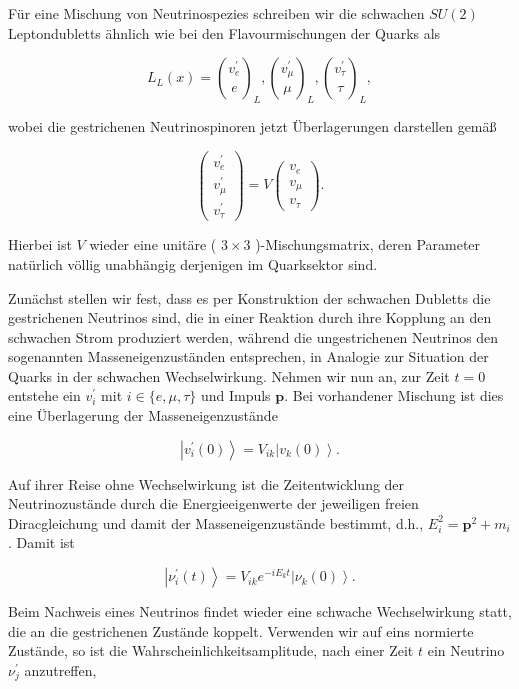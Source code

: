 \documentclass[10pt, letterpaper]{article}
\begin{document}
Für eine Mischung von Neutrinospezies schreiben wir die schwachen $S U(2)$ Leptondubletts ähnlich wie bei den Flavourmischungen der Quarks als

$$
L_{L}(x)=\binom{v_{e}^{\prime}}{e}_{L},\binom{v_{\mu}^{\prime}}{\mu}_{L},\binom{v_{\tau}^{\prime}}{\tau}_{L},
$$

wobei die gestrichenen Neutrinospinoren jetzt Überlagerungen darstellen gemäß

$$
\left(\begin{array}{l}
v_{e}^{\prime} \\
v_{\mu}^{\prime} \\
v_{\tau}^{\prime}
\end{array}\right)=V\left(\begin{array}{l}
v_{e} \\
v_{\mu} \\
v_{\tau}
\end{array}\right) .
$$

Hierbei ist $V$ wieder eine unitäre ( $3 \times 3$ )-Mischungsmatrix, deren Parameter natürlich völlig unabhängig derjenigen im Quarksektor sind.

Zunächst stellen wir fest, dass es per Konstruktion der schwachen Dubletts die gestrichenen Neutrinos sind, die in einer Reaktion durch ihre Kopplung an den schwachen Strom produziert werden, während die ungestrichenen Neutrinos den sogenannten Masseneigenzuständen entsprechen, in Analogie zur Situation der Quarks in der schwachen Wechselwirkung. Nehmen wir nun an, zur Zeit $t=0$ entstehe ein $v_{i}^{\prime}$ mit $i \in\{e, \mu, \tau\}$ und Impuls $\mathbf{p}$. Bei vorhandener Mischung ist dies eine Überlagerung der Masseneigenzustände

$$
\left|v_{i}^{\prime}(0)\right\rangle=V_{i k}\left|v_{k}(0)\right\rangle .
$$

Auf ihrer Reise ohne Wechselwirkung ist die Zeitentwicklung der Neutrinozustände durch die Energieeigenwerte der jeweiligen freien Diracgleichung und damit der Masseneigenzustände bestimmt, d.h., $E_{i}^{2}=\mathbf{p}^{2}+m_{i}$. Damit ist

$$
\left|\nu_{i}^{\prime}(t)\right\rangle=V_{i k} e^{-i E_{k} t}\left|\nu_{k}(0)\right\rangle .
$$

Beim Nachweis eines Neutrinos findet wieder eine schwache Wechselwirkung statt, die an die gestrichenen Zustände koppelt. Verwenden wir auf eins normierte Zustände, so ist die Wahrscheinlichkeitsamplitude, nach einer Zeit $t$ ein Neutrino $\nu_{j}^{\prime}$ anzutreffen,
\end{document}
